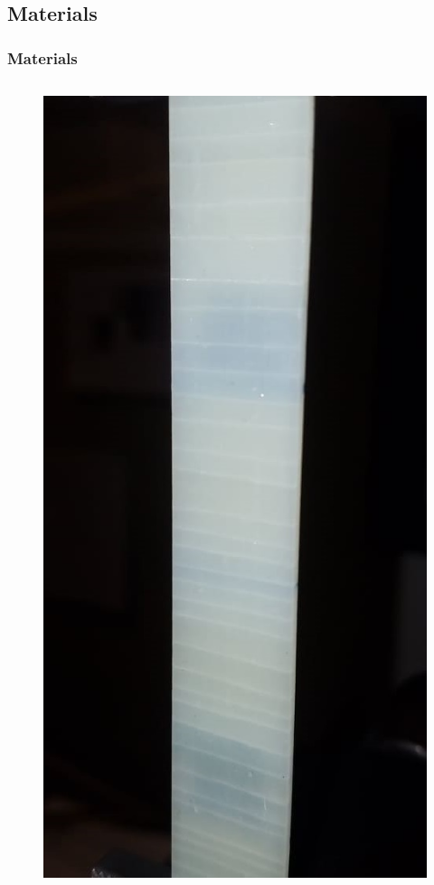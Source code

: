 \documentclass[first,firstsupp,lastsupp,last,hyperref,table]{ETHclass}
\begin{document}
\subsection{Materials}

\begin{frame}
\frametitle{\vspace{0.3cm}\small Materials}
\vspace{-0.75cm}
\centering
\begin{columns}[c]
\begin{column}{0.5\textwidth}
\begin{figure}
\centering
\includegraphics[height=0.8\textheight]{0-90_2_symm}

\end{figure}
\end{column}
\end{columns}
\end{frame}
\end{document}

